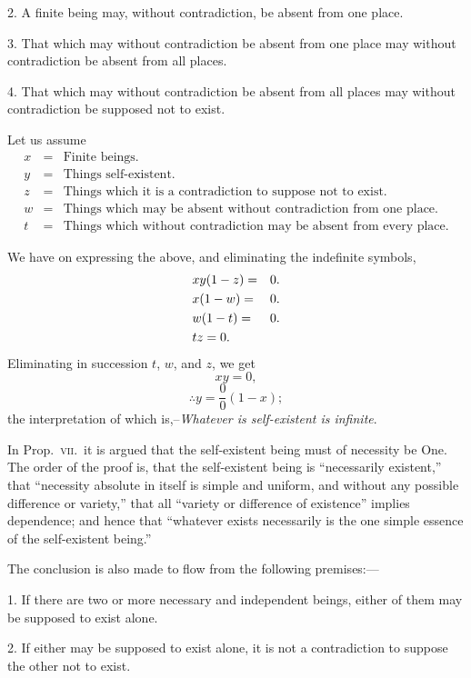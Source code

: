 \documentclass[oneside]{book}
\begin{document}
2. A finite being may, without contradiction, be absent from
one place.

3. That which may without contradiction be absent from one
place may without contradiction be absent from all places.

4. That which may without contradiction be absent from all
places may without contradiction be supposed not to exist.

Let us assume
\begin{eqnarray*}
x &=& \textrm{Finite beings.}\\
y &=& \textrm{Things self-existent.}\\
z &=& \textrm{Things which it is a contradiction to suppose not to exist.}\\
w &=& \textrm{Things which may be absent without contradiction from
one place.}\\
t &=& \textrm{Things which without contradiction may be absent from
every place.}
\end{eqnarray*}


We have on expressing the above, and eliminating the indefinite
symbols,
\begin{eqnarray}\setcounter{equation}{1}
&xy(1-z) =& 0.\\
&x(1-w)  =& 0.\\
&w(1-t)  =& 0.\\
&tz = 0. %
\end{eqnarray}
Eliminating in succession $t$, $w$, and $z$, we get
\[
   xy = 0,
\]
\[
   \therefore y = \frac{0}{0}(1-x);
\]
the interpretation of which is,--\emph{Whatever is self-existent is infinite}.

In Prop.~\textsc{vii}.\ it is argued that the self-existent being must of
necessity be One. The order of the proof is, that the self-existent
being is ``necessarily existent,'' that ``necessity absolute in
itself is simple and uniform, and without any possible difference
or variety,'' that all ``variety or difference of existence'' implies
dependence; and hence that ``whatever exists necessarily is the
one simple essence of the self-existent being.''

The conclusion is also made to flow from the following premises:---

1. If there are two or more necessary and independent beings,
either of them may be supposed to exist alone.

2. If either may be supposed to exist alone, it is not a contradiction
to suppose the other not to exist.
\end{document}
